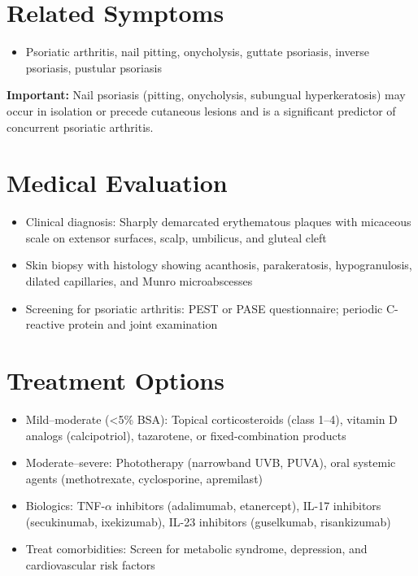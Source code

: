 \section*{Related Symptoms}
\begin{itemize}
  \item Psoriatic arthritis, nail pitting, onycholysis, guttate psoriasis, inverse psoriasis, pustular psoriasis
\end{itemize}
\textbf{Important:} Nail psoriasis (pitting, onycholysis, subungual hyperkeratosis) may occur in isolation or precede cutaneous lesions and is a significant predictor of concurrent psoriatic arthritis.

\section*{Medical Evaluation}
\begin{itemize}
  \item Clinical diagnosis: Sharply demarcated erythematous plaques with micaceous scale on extensor surfaces, scalp, umbilicus, and gluteal cleft
  \item Skin biopsy with histology showing acanthosis, parakeratosis, hypogranulosis, dilated capillaries, and Munro microabscesses
  \item Screening for psoriatic arthritis: PEST or PASE questionnaire; periodic C-reactive protein and joint examination
\end{itemize}

\section*{Treatment Options}
\begin{itemize}
  \item Mild--moderate (<5\% BSA): Topical corticosteroids (class 1--4), vitamin D analogs (calcipotriol), tazarotene, or fixed-combination products
  \item Moderate--severe: Phototherapy (narrowband UVB, PUVA), oral systemic agents (methotrexate, cyclosporine, apremilast)
  \item Biologics: TNF-\ensuremath{\alpha} inhibitors (adalimumab, etanercept), IL-17 inhibitors (secukinumab, ixekizumab), IL-23 inhibitors (guselkumab, risankizumab)
  \item Treat comorbidities: Screen for metabolic syndrome, depression, and cardiovascular risk factors
\end{itemize}

